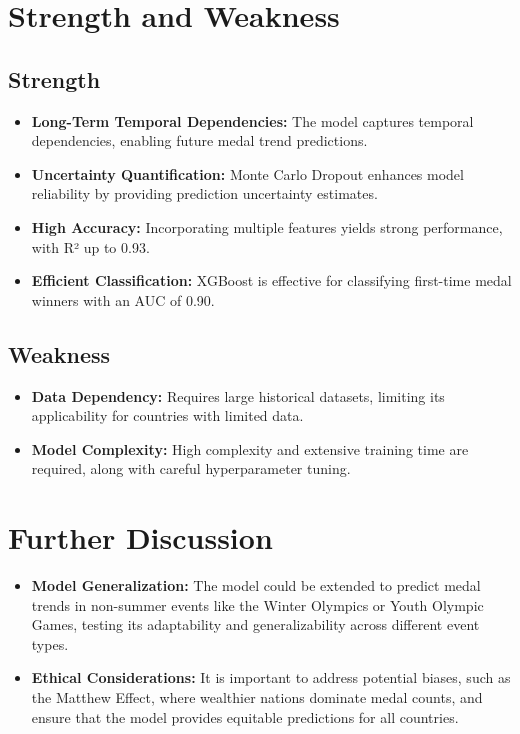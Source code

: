 \documentclass{mcmthesis}
\begin{document}
\section{Strength and Weakness}


\subsection{Strength}
\begin{itemize}[itemsep=1pt, parsep=2pt, topsep=0pt] %
	\item \textbf{Long-Term Temporal Dependencies:} The model captures temporal dependencies, enabling future medal trend predictions.
	\item \textbf{Uncertainty Quantification:} Monte Carlo Dropout enhances model reliability by providing prediction uncertainty estimates.
	\item \textbf{High Accuracy:} Incorporating multiple features yields strong performance, with R² up to 0.93.
	\item \textbf{Efficient Classification:} XGBoost is effective for classifying first-time medal winners with an AUC of 0.90.
\end{itemize}

\subsection{Weakness}
\begin{itemize}[itemsep=1pt, parsep=2pt, topsep=0pt] %
	\item \textbf{Data Dependency:} Requires large historical datasets, limiting its applicability for countries with limited data.
	\item \textbf{Model Complexity:} High complexity and extensive training time are required, along with careful hyperparameter tuning.
\end{itemize}


\section{Further Discussion}

\begin{itemize}[itemsep=1pt, parsep=2pt, topsep=0pt]
	\item \textbf{Model Generalization:} The model could be extended to predict medal trends in non-summer events like the Winter Olympics or Youth Olympic Games, testing its adaptability and generalizability across different event types.
	\item \textbf{Ethical Considerations:} It is important to address potential biases, such as the Matthew Effect, where wealthier nations dominate medal counts, and ensure that the model provides equitable predictions for all countries.
\end{itemize}
\end{document}
